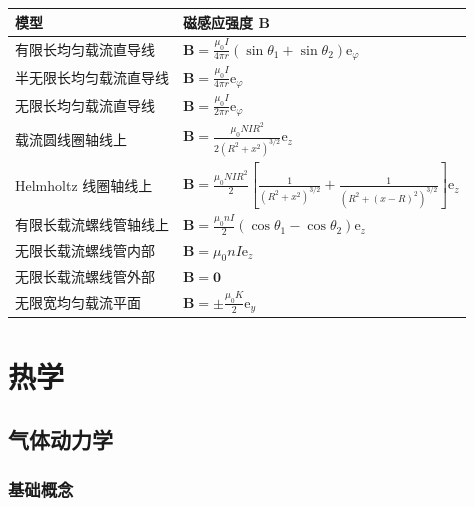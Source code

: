 \documentclass[UTF8,fontset=fandol,zihao=5]{ctexart}
\newcommand{\ee}{\mathrm{e}}
\newcommand{\vect}[1]{\bm{#1}}
\begin{document}
\begin{center}
\small
\renewcommand{\arraystretch}{1.8}
\begin{tabularx}{0.99\textwidth}{
    >{\raggedright\arraybackslash}p{3.5cm}
    >{\raggedright\arraybackslash}X
}
\toprule
\textbf{模型} & \textbf{磁感应强度 $\vect B$} \\
\midrule

有限长均匀载流直导线 &
$\displaystyle
\vect B =
\frac{\mu_0 I}{4\pi r}
(\sin\theta_1+\sin\theta_2)
\vect \ee_\varphi
$ \\

半无限长均匀载流直导线 &
$\displaystyle
\vect B =
\frac{\mu_0 I}{4\pi r}
\vect \ee_\varphi
$ \\

无限长均匀载流直导线 &
$\displaystyle
\vect B =
\frac{\mu_0 I}{2\pi r}
\vect \ee_\varphi
$ \\

载流圆线圈轴线上 &
$\displaystyle
\vect B =
\frac{\mu_0 NIR^2}
{2(R^2+x^2)^{3/2}}
\vect \ee_z
$ \\

Helmholtz 线圈轴线上 &
$\displaystyle
\vect B =
\frac{\mu_0 NIR^2}{2}
\left[
\frac{1}{(R^2+x^2)^{3/2}}
+
\frac{1}{(R^2+(x-R)^2)^{3/2}}
\right]\vect \ee_z
$ \\

有限长载流螺线管轴线上 &
$\displaystyle
\vect B =
\frac{\mu_0 nI}{2}
(\cos\theta_1-\cos\theta_2)
\vect \ee_z
$ \\

无限长载流螺线管内部 &
$\displaystyle
\vect B = \mu_0 nI\vect \ee_z
$ \\

无限长载流螺线管外部 &
$\displaystyle
\vect B = \vect 0
$ \\

无限宽均匀载流平面 &
$\displaystyle
\vect B =
\pm\frac{\mu_0 K}{2}\vect \ee_y
$ \\

\bottomrule
\end{tabularx}
\end{center}
\section{热学}

\subsection{气体动力学}

\subsubsection{基础概念}
\end{document}
